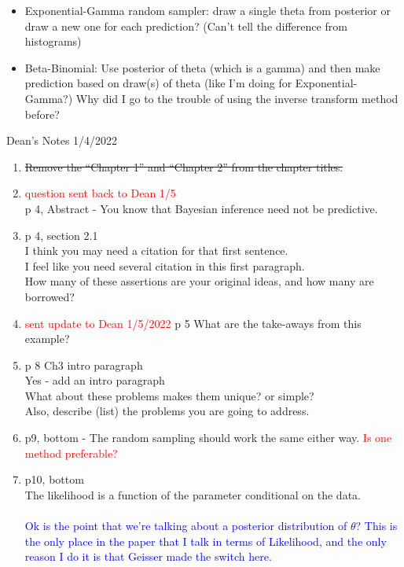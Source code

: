 \documentclass[12pt, a4paper]{article}
\begin{document}
\begin{itemize}
  \item Exponential-Gamma random sampler:  draw a single theta from posterior or draw a new one for each prediction?  (Can't tell the difference from histograms)
  \item Beta-Binomial:  Use posterior of theta (which is a gamma) and then make prediction based on draw(s) of theta (like I'm doing for Exponential-Gamma?)  Why did I go to the trouble of using the inverse transform method before?
\end{itemize}


{\huge Dean's Notes 1/4/2022}
\begin{enumerate}
  \item \sout{Remove the ``Chapter 1” and “Chapter 2” from the chapter titles.}
  \item \textcolor{red}{question sent back to Dean 1/5}\\
    p 4, Abstract - You know that Bayesian inference need not be predictive.
  \item p 4, section 2.1 \\
    I think you may need a citation for that first  sentence.\\
    I feel like you need several citation in this first paragraph.\\
    How many of these assertions are your original ideas, and how many are borrowed?\\

  \item \textcolor{red}{sent update to Dean 1/5/2022} p 5  What are the take-aways from this example?
  \item p 8 Ch3  intro paragraph\\
    Yes - add an intro paragraph\\
    What about these problems makes them unique? or simple?\\
    Also, describe (list) the problems you are going to address.\\
  \item p9, bottom - The random sampling should work the same either way.  \textcolor{red}{Is one method preferable?}
  \item p10, bottom \\
    The likelihood is a function of the parameter conditional on the data.\\\\

\textcolor{blue}{Ok is the point that we're talking about a posterior distribution of $\theta$?  This is the only place in the paper that I talk in terms of Likelihood, and the only reason I do it is that Geisser made the switch here.}\\\\


\end{enumerate}
\end{document}
